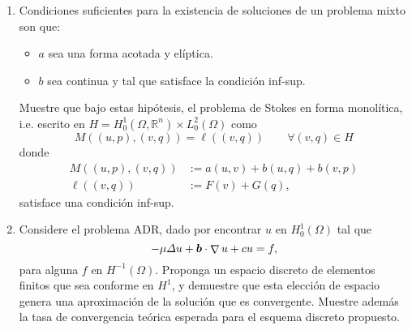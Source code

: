 \documentclass{article}
\renewcommand{\vec}{\vectorsym}
\DeclareMathOperator{\grad}{\nabla}
\newcommand{\R}{\mathbb{R}}
\newcommand{\pts}[1]{[{\bf #1 puntos}] }
\begin{document}
\begin{enumerate}
    \item\pts{2} Condiciones suficientes para la existencia de soluciones de un problema mixto son que:
            \begin{itemize}
                \item $a$ sea una forma acotada y elíptica.
                \item $b$ sea continua y tal que satisface la condición inf-sup.
            \end{itemize}
            Muestre que bajo estas hipótesis, el problema de Stokes en forma monolítica, i.e. escrito en $H = H_0^1(\Omega, \R^n) \times L_0^2(\Omega)$ como
                $$ M((u,p), (v,q)) = \ell((v,q)) \qquad\forall (v,q) \in H $$
                donde 
                $$\begin{aligned}
                    M((u,p), (v,q)) &:= a(u,v) + b(u,q) + b(v,p) \\
                    \ell((v,q))  &:= F(v) + G(q),
                \end{aligned}$$
                satisface una condición inf-sup. 

    \item\pts{2} Considere el problema ADR, dado por encontrar $u$ en $H_0^1(\Omega)$ tal que
            $$ -\mu \Delta u + \vec b \cdot \grad u + cu = f, $$
            para alguna $f$ en $H^{-1}(\Omega)$. Proponga un espacio discreto de elementos finitos que sea conforme en $H^1$, y demuestre que esta elección de espacio genera una aproximación de la solución que es convergente. Muestre además la tasa de convergencia teórica esperada para el esquema discreto propuesto. 


\end{enumerate}
\end{document}
